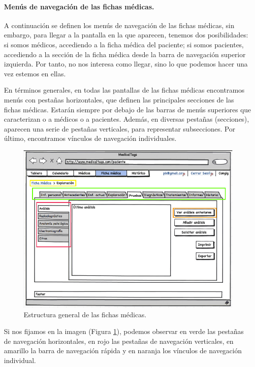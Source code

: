 \documentclass[a4paper,oneside,11pt]{book}
\begin{document}
		\paragraph{Menús de navegación de las fichas médicas.} %
		\label{par:nav_menus_de_navegacion_de_las_fichas_medicas}
		
		A continuación se definen los menús de navegación de las fichas médicas, sin embargo, para llegar a la pantalla en la que aparecen, tenemos dos posibilidades: si somos médicos, accediendo a la ficha médica del paciente; si somos pacientes, accediendo a la sección de la ficha médica desde la barra de navegación superior izquierda. Por tanto, no nos interesa como llegar, sino lo que podemos hacer una vez estemos en ellas. 
		
		En términos generales, en todas las pantallas de las fichas médicas encontramos menús con pestañas horizontales, que definen las principales secciones de las fichas médicas. Estarán siempre por debajo de las barras de menús superiores que caracterizan o a médicos o a pacientes. Además, en diversas pestañas (secciones), aparecen una serie de pestañas verticales, para representar subsecciones. Por último, encontramos vínculos de navegación individuales.
		
		\begin{figure}[H]
		  \centering
		    \includegraphics[width=15cm]{img/jpg/nav/fichamedica.jpg}
		  \caption{Estructura general de las fichas médicas.}
		  \label{fig:nav_ficha}
		\end{figure}
		
		Si nos fijamos en la imagen (Figura \ref{fig:nav_ficha}), podemos observar en verde las pestañas de navegación horizontales, en rojo las pestañas de navegación verticales, en amarillo la barra de navegación rápida y en naranja los vínculos de navegación individual.
		
\end{document}
